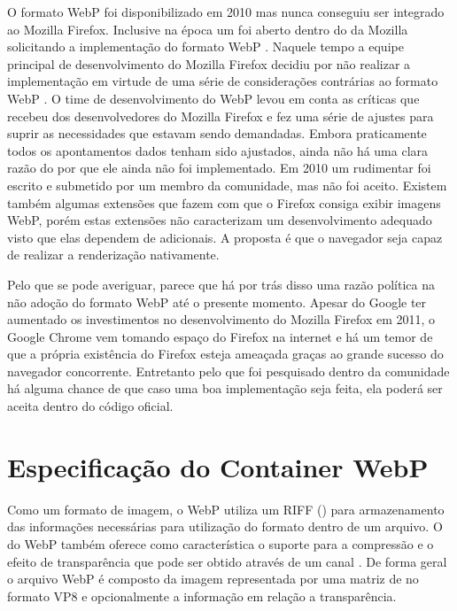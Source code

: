\documentclass[espaco=simples,appendix=Name]{abnt}
\begin{document}
O formato WebP foi disponibilizado em 2010 mas nunca conseguiu ser integrado ao Mozilla Firefox. Inclusive na época um  foi aberto dentro do  da Mozilla solicitando a implementação do formato WebP \cite{FirefoxBug}. Naquele tempo a equipe principal de desenvolvimento do Mozilla Firefox decidiu por não realizar a implementação em virtude de uma série de considerações contrárias ao formato WebP \cite{WebPCritica}. O time de desenvolvimento do WebP levou em conta as críticas que recebeu dos desenvolvedores do Mozilla Firefox e fez uma série de ajustes para suprir as necessidades que estavam sendo demandadas. Embora praticamente todos os apontamentos dados tenham sido ajustados, ainda não há uma clara razão do por que ele ainda não foi implementado. Em 2010 um  rudimentar foi escrito e submetido por um membro da comunidade, mas não foi aceito. Existem também algumas extensões que fazem com que o Firefox consiga exibir imagens WebP, porém estas extensões não caracterizam um desenvolvimento adequado visto que elas dependem de  adicionais. A proposta é que o navegador seja capaz de realizar a renderização nativamente.

Pelo que se pode averiguar, parece que há por trás disso uma razão política na não adoção do formato WebP até o presente momento. Apesar do Google ter aumentado os investimentos no desenvolvimento do Mozilla Firefox em 2011, o Google Chrome vem tomando espaço do Firefox na internet e há um temor de que a própria existência do Firefox esteja ameaçada graças ao grande sucesso do navegador concorrente. Entretanto pelo que foi pesquisado dentro da comunidade há alguma chance de que caso uma boa implementação seja feita, ela poderá ser aceita dentro do código oficial.

\section{Especificação do Container WebP}

Como um formato de imagem, o WebP utiliza um  RIFF () para armazenamento das informações necessárias para utilização do formato dentro de um arquivo. O  do WebP também oferece como característica o suporte para a compressão  e o efeito de transparência que pode ser obtido através de um canal . De forma geral o arquivo WebP é composto da imagem representada por uma matriz de  no formato VP8 e opcionalmente a informação em relação a transparência.
\end{document}
